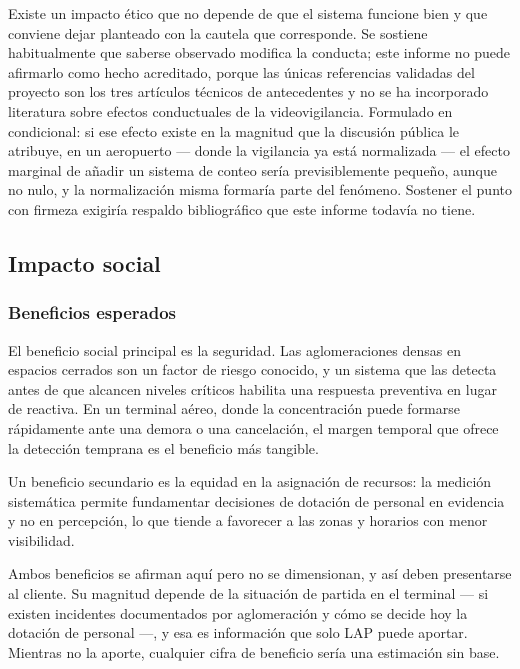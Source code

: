 Existe un impacto ético que no depende de que el sistema funcione bien y
que conviene dejar planteado con la cautela que corresponde. Se sostiene
habitualmente que saberse observado modifica la conducta; este informe no
puede afirmarlo como hecho acreditado, porque las únicas referencias
validadas del proyecto son los tres artículos técnicos de antecedentes y
no se ha incorporado literatura sobre efectos conductuales de la
videovigilancia. Formulado en condicional: si ese efecto existe en la
magnitud que la discusión pública le atribuye, en un aeropuerto ---
donde la vigilancia ya está normalizada --- el efecto marginal de añadir
un sistema de conteo sería previsiblemente pequeño, aunque no nulo, y la
normalización misma formaría parte del fenómeno. Sostener el punto con
firmeza exigiría respaldo bibliográfico que este informe todavía no
tiene.

\subsection{Impacto social}
\label{sec:impacto-social}

\subsubsection{Beneficios esperados}

El beneficio social principal es la seguridad. Las aglomeraciones densas
en espacios cerrados son un factor de riesgo conocido, y un sistema que
las detecta antes de que alcancen niveles críticos habilita una respuesta
preventiva en lugar de reactiva. En un terminal aéreo, donde la
concentración puede formarse rápidamente ante una demora o una
cancelación, el margen temporal que ofrece la detección temprana es el
beneficio más tangible.

Un beneficio secundario es la equidad en la asignación de recursos: la
medición sistemática permite fundamentar decisiones de dotación de
personal en evidencia y no en percepción, lo que tiende a favorecer a las
zonas y horarios con menor visibilidad.

Ambos beneficios se afirman aquí pero no se dimensionan, y así deben
presentarse al cliente. Su magnitud depende de la situación de partida en
el terminal --- si existen incidentes documentados por aglomeración y
cómo se decide hoy la dotación de personal ---, y esa es información que
solo LAP puede aportar. Mientras no la aporte, cualquier cifra de
beneficio sería una estimación sin base.

